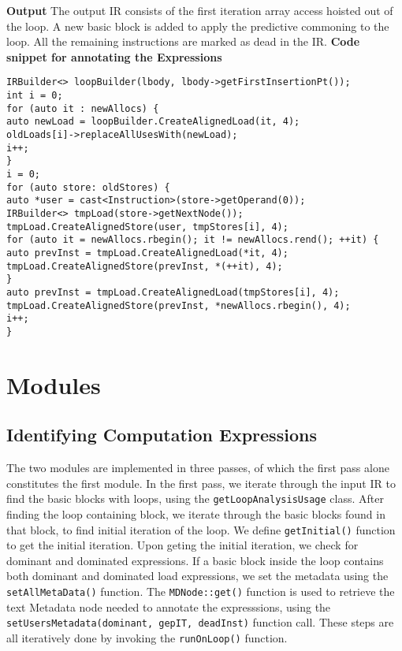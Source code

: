\noindent
\textbf{Output}\newline
The output IR consists of the first iteration array access hoisted out of the loop. A new basic block is added to apply the predictive commoning to the loop. All the remaining instructions are marked as dead in the IR.\newline
\textbf{Code snippet for annotating the Expressions}
\begin{lstlisting}
IRBuilder<> loopBuilder(lbody, lbody->getFirstInsertionPt());
int i = 0;
for (auto it : newAllocs) {
auto newLoad = loopBuilder.CreateAlignedLoad(it, 4);
oldLoads[i]->replaceAllUsesWith(newLoad);
i++;
}
i = 0;
for (auto store: oldStores) {
auto *user = cast<Instruction>(store->getOperand(0));
IRBuilder<> tmpLoad(store->getNextNode());
tmpLoad.CreateAlignedStore(user, tmpStores[i], 4);
for (auto it = newAllocs.rbegin(); it != newAllocs.rend(); ++it) {
auto prevInst = tmpLoad.CreateAlignedLoad(*it, 4);
tmpLoad.CreateAlignedStore(prevInst, *(++it), 4);
}
auto prevInst = tmpLoad.CreateAlignedLoad(tmpStores[i], 4);
tmpLoad.CreateAlignedStore(prevInst, *newAllocs.rbegin(), 4);
i++;
}

\end{lstlisting}

\section{Modules}
\subsection{Identifying Computation Expressions}
The two modules are implemented in three passes, of which the first pass alone constitutes the first module. In the first pass, we iterate through the input IR to find the basic blocks with loops, using the \texttt	{getLoopAnalysisUsage} class. After finding the loop containing block, we iterate through the basic blocks found in that block, to find initial iteration of the loop. We define \texttt{getInitial()} function to get the initial iteration. Upon geting the initial iteration, we check for dominant and dominated expressions. If a basic block inside the loop contains both dominant and dominated load expressions, we set the metadata using the 
\texttt{setAllMetaData()} function. The \texttt{MDNode::get()} function is used to retrieve the text Metadata node needed to annotate the expresssions, using the \texttt{ setUsersMetadata(dominant, gepIT, deadInst)} function call. These steps are all iteratively done by invoking the \texttt{runOnLoop()} function. 


